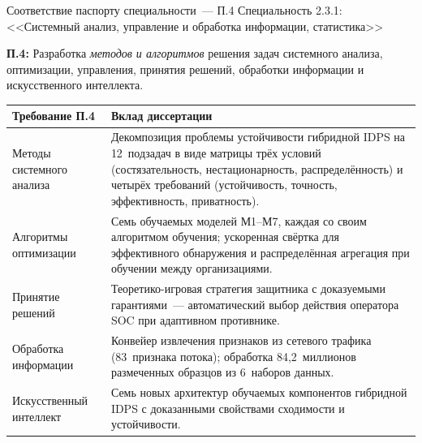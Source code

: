 \documentclass[10pt,aspectratio=169]{beamer}
\begin{document}
\begin{frame}{Соответствие паспорту специальности~--- П.4}
{\footnotesize Специальность 2.3.1: <<Системный анализ,
управление и обработка информации, статистика>>}
\smallskip

\textbf{П.4:} Разработка \emph{методов и алгоритмов} решения
задач системного анализа, оптимизации, управления, принятия
решений, обработки информации и искусственного интеллекта.
\medskip

\footnotesize
\begin{tabular}{p{3.8cm}p{10.4cm}}
\toprule
\textbf{Требование П.4} & \textbf{Вклад диссертации} \\
\midrule
Методы системного анализа & Декомпозиция проблемы устойчивости
гибридной IDPS на 12~подзадач в виде матрицы трёх условий
(состязательность, нестационарность, распределённость) и
четырёх требований (устойчивость, точность, эффективность,
приватность). \\
\midrule
Алгоритмы оптимизации & Семь обучаемых моделей М1--М7,
каждая со своим алгоритмом обучения; ускоренная свёртка для
эффективного обнаружения и распределённая агрегация при
обучении между организациями. \\
\midrule
Принятие решений & Теоретико-игровая стратегия защитника с
доказуемыми гарантиями~--- автоматический выбор действия
оператора SOC при адаптивном противнике. \\
\midrule
Обработка информации & Конвейер извлечения признаков из
сетевого трафика (83~признака потока); обработка
84{,}2~миллионов размеченных образцов из 6~наборов данных. \\
\midrule
Искусственный интеллект & Семь новых архитектур обучаемых
компонентов гибридной IDPS с доказанными свойствами
сходимости и устойчивости. \\
\bottomrule
\end{tabular}
\end{frame}
\end{document}
